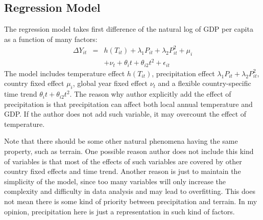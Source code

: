 \documentclass[letterpaper]{article}
\begin{document}
\subsection{Regression Model}


The regression model takes first difference of the natural log of GDP per capita as a function of many factors:
\begin{eqnarray}
  \Delta Y_{it} & = & h(T_{it}) + \lambda_1P_{it} + \lambda_2P_{it}^2 + \mu_i\nonumber\\
                & & + \nu_t + \theta_it + \theta_{i2}t^2 + \epsilon_{it} \label{main}
\end{eqnarray}
The model includes temperature effect $h(T_{it})$, precipitation effect $\lambda_1P_{it} + \lambda_2P_{it}^2$, country fixed effect $\mu_i$, global year fixed effect $\nu_t$ and a flexible country-specific time trend $\theta_it + \theta_{i2}t^2$. The reason why author explicitly add the effect of precipitation is that precipitation can affect both local annual temperature and GDP. If the author does not add such variable, it may overcount the effect of temperature.

Note that there should be some other natural phenomena having the same property, such as terrain. One possible reason author does not include this kind of variables is that most of the effects of such variables are covered by other country fixed effects and time trend. Another reason is just to maintain the simplicity of the model, since too many variables will only increase the complexity and difficulty in data analysis and may lead to overfitting. This does not mean there is some kind of priority between precipitation and terrain. In my opinion, precipitation here is just a representation in such kind of factors.
\end{document}
